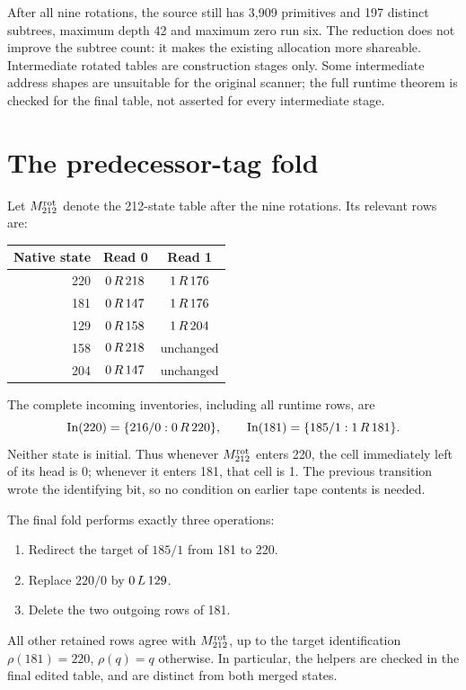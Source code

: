 After all nine rotations, the source still has 3,909 primitives and 197
distinct subtrees, maximum depth 42 and maximum zero run six. The reduction
does not improve the subtree count: it makes the existing allocation more
shareable. Intermediate rotated tables are construction stages only. Some
intermediate address shapes are unsuitable for the original scanner; the
full runtime theorem is checked for the final table, not asserted for
every intermediate stage.

\section{The predecessor-tag fold}
\label{sec:fold}

Let $M^{\mathrm{rot}}_{212}$ denote the 212-state table after the nine rotations. Its relevant
rows are:
\begin{center}
\begin{tabular}{rcc}
\toprule
Native state & Read 0 & Read 1\\
\midrule
220 & $0\,R\,218$ & $1\,R\,176$\\
181 & $0\,R\,147$ & $1\,R\,176$\\
129 & $0\,R\,158$ & $1\,R\,204$\\
158 & $0\,R\,218$ & unchanged\\
204 & $0\,R\,147$ & unchanged\\
\bottomrule
\end{tabular}
\end{center}
The complete incoming inventories, including all runtime rows, are
\[
 \operatorname{In}(220)=\{216/0:0\,R\,220\},\qquad
 \operatorname{In}(181)=\{185/1:1\,R\,181\}.
\]
Neither state is initial. Thus whenever $M^{\mathrm{rot}}_{212}$ enters 220, the cell immediately
left of its head is 0; whenever it enters 181, that cell is 1. The previous
transition wrote the identifying bit, so no condition on earlier tape
contents is needed.

The final fold performs exactly three operations:
\begin{enumerate}
\item Redirect the target of $185/1$ from 181 to 220.
\item Replace $220/0$ by $0\,L\,129$.
\item Delete the two outgoing rows of 181.
\end{enumerate}
All other retained rows agree with $M^{\mathrm{rot}}_{212}$, up to the target identification
$\rho(181)=220$, $\rho(q)=q$ otherwise. In particular, the helpers are checked
in the final edited table, and are distinct from both merged states.

